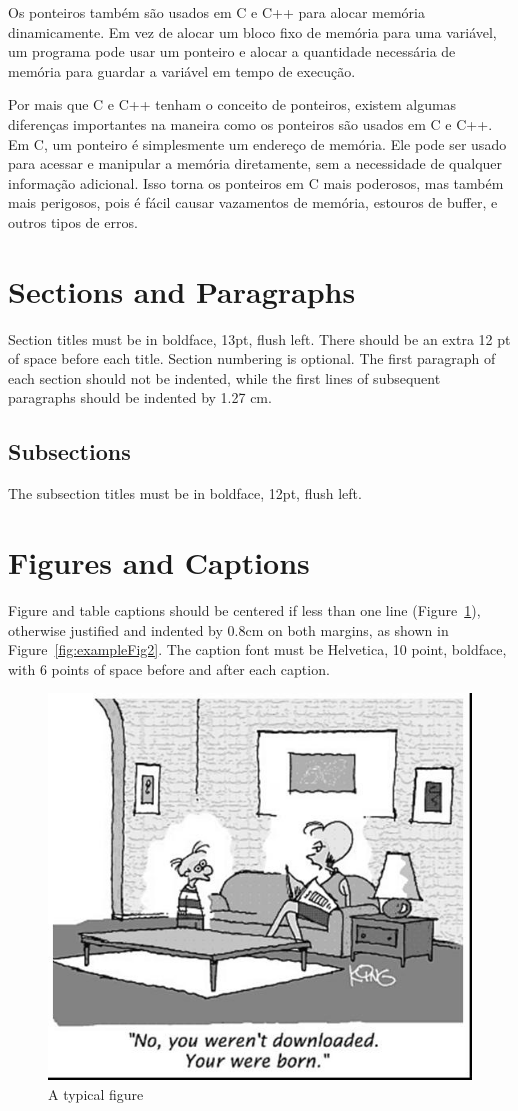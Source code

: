 \documentclass[12pt]{article}
\begin{document}
Os ponteiros também são usados em C e C++ para alocar memória dinamicamente. Em vez de alocar um bloco fixo de memória para uma variável, um programa pode usar um ponteiro e alocar a quantidade necessária de memória para guardar a variável em tempo de execução.

Por mais que C e C++ tenham o conceito de ponteiros, existem algumas diferenças importantes na maneira como os ponteiros são usados em C e C++. Em C, um ponteiro é simplesmente um endereço de memória. Ele pode ser usado para acessar e manipular a memória diretamente, sem a necessidade de qualquer informação adicional. Isso torna os ponteiros em C mais poderosos, mas também mais perigosos, pois é fácil causar vazamentos de memória, estouros de buffer, e outros tipos de erros.

\section{Sections and Paragraphs}

Section titles must be in boldface, 13pt, flush left. There should be an extra
12 pt of space before each title. Section numbering is optional. The first
paragraph of each section should not be indented, while the first lines of
subsequent paragraphs should be indented by 1.27 cm.

\subsection{Subsections}

The subsection titles must be in boldface, 12pt, flush left.

\section{Figures and Captions}\label{sec:figs}


Figure and table captions should be centered if less than one line
(Figure~\ref{fig:exampleFig1}), otherwise justified and indented by 0.8cm on
both margins, as shown in Figure~\ref{fig:exampleFig2}. The caption font must
be Helvetica, 10 point, boldface, with 6 points of space before and after each
caption.

\begin{figure}[ht]
\centering
\includegraphics[width=.5\textwidth]{fig1.jpg}
\caption{A typical figure}
\label{fig:exampleFig1}
\end{figure}
\end{document}
